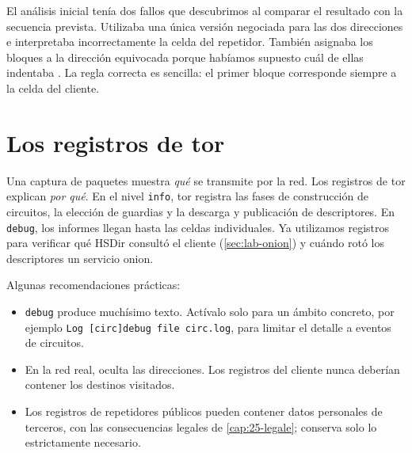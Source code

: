 \begin{attenzione}
El análisis inicial tenía dos fallos que descubrimos al comparar el resultado con la secuencia prevista. Utilizaba una única versión negociada para las dos direcciones e interpretaba incorrectamente la celda  del repetidor. También asignaba los bloques a la dirección equivocada porque habíamos supuesto cuál de ellas indentaba . La regla correcta es sencilla: el primer bloque corresponde siempre a la celda  del cliente.
\end{attenzione}

\section{Los registros de tor}\label{sec:traffico-log}

Una captura de paquetes muestra \emph{qué} se transmite por la red. Los registros de tor explican \emph{por qué}. En el nivel \texttt{info}, tor registra las fases de construcción de circuitos, la elección de guardias y la descarga y publicación de descriptores. En \texttt{debug}, los informes llegan hasta las celdas individuales. Ya utilizamos registros para verificar qué HSDir consultó el cliente (\cref{sec:lab-onion}) y cuándo rotó los descriptores un servicio onion.

Algunas recomendaciones prácticas:
\begin{itemize}
  \item \texttt{debug} produce muchísimo texto. Actívalo solo para un ámbito concreto, por ejemplo \texttt{Log [circ]debug file circ.log}, para limitar el detalle a eventos de circuitos.
  \item En la red real,  oculta las direcciones. Los registros del cliente nunca deberían contener los destinos visitados.
  \item Los registros de repetidores públicos pueden contener datos personales de terceros, con las consecuencias legales de \cref{cap:25-legale}; conserva solo lo estrictamente necesario.
\end{itemize}

